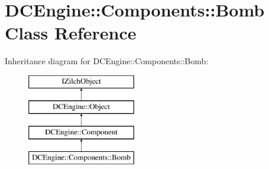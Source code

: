 \hypertarget{classDCEngine_1_1Components_1_1Bomb}{\section{D\-C\-Engine\-:\-:Components\-:\-:Bomb Class Reference}
\label{classDCEngine_1_1Components_1_1Bomb}
}
Inheritance diagram for D\-C\-Engine\-:\-:Components\-:\-:Bomb\-:\begin{figure}[H]
\begin{center}
\leavevmode
\includegraphics[height=4.000000cm]{classDCEngine_1_1Components_1_1Bomb}
\end{center}
\end{figure}
